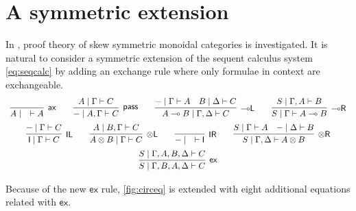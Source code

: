 \documentclass[copyright,creativecommons]{eptcs}
\theoremstyle{definition}
\newcommand{\tl}{\otimes \mathsf{L}}
\newcommand{\tr}{\otimes \mathsf{R}}
\newcommand{\lright}{{\multimap}\mathsf{R}}
\newcommand{\lleft}{{\multimap}\mathsf{L}}
\newcommand{\pass}{\mathsf{pass}}
\newcommand{\unitl}{\mathsf{IL}}
\newcommand{\unitr}{\mathsf{IR}}
\newcommand{\ax}{\mathsf{ax}}
\newcommand{\ot}{\otimes}
\newcommand{\lolli}{\multimap}
\newcommand{\I}{\mathsf{I}}
\newcommand{\ex}{\mathsf{ex}}
\begin{document}
\section{A symmetric extension}
In \cite{veltri:coherence:2021}, proof theory of skew symmetric monoidal categories is investigated.
It is natural to consider a symmetric extension of the sequent calculus system \ref{eq:seqcalc} by adding an exchange rule where only formulae in context are exchangeable.
\begin{equation}\label{eq:seqcalc:sym}
  \def\arraystretch{2.5}
  \begin{array}{c}
    \infer[\ax]{A \mid \quad \vdash A}{}
    \qquad
    \infer[\pass]{{-} \mid A , \Gamma \vdash C}{A \mid \Gamma \vdash C}
    \qquad
    \infer[\lleft]{A \lolli B \mid \Gamma , \Delta \vdash C}{
      {-} \mid \Gamma \vdash A
      &
      B \mid \Delta \vdash C
    }
    \qquad
    \infer[\lright]{S \mid \Gamma \vdash A \lolli B}{S \mid \Gamma , A \vdash B}
    \\
    \infer[\unitl]{\I \mid \Gamma \vdash C}{{-} \mid \Gamma \vdash C}
    \qquad
    \infer[\tl]{A \ot B \mid \Gamma \vdash C}{A \mid B , \Gamma \vdash C}
    \qquad
    \infer[\unitr]{{-} \mid \quad \vdash \I}{}
    \qquad
    \infer[\tr]{S \mid \Gamma , \Delta \vdash A \ot B}{
      S \mid \Gamma \vdash A
      &
      {-} \mid \Delta \vdash B
    }
    \\
    \infer[\ex]{S \mid \Gamma , B , A , \Delta \vdash C}{S \mid \Gamma , A , B , \Delta \vdash C}
  \end{array}
\end{equation}
Because of the new $\ex$ rule, \ref{fig:circeq} is extended with eight additional equations related with $\ex$.
\end{document}
